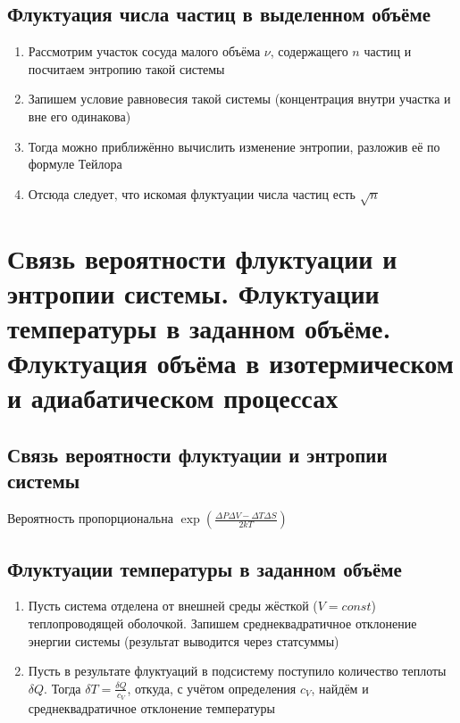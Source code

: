 \documentclass[a4paper, 14pt]{article}
\begin{document}
    \subsection{Флуктуация числа частиц в выделенном объёме}

    \begin{enumerate}
        \item Рассмотрим участок сосуда малого объёма $\nu$, содержащего $n$ частиц и посчитаем энтропию такой системы
        \item Запишем условие равновесия такой системы (концентрация внутри участка и вне его одинакова)
        \item Тогда можно приближённо вычислить изменение энтропии, разложив её по формуле Тейлора
        \item Отсюда следует, что искомая флуктуации числа частиц есть $\sqrt{n}$
    \end{enumerate}

    \section{Связь вероятности флуктуации и энтропии системы.
    Флуктуации температуры в заданном объёме.
    Флуктуация объёма в изотермическом и адиабатическом процессах}

    \subsection{Связь вероятности флуктуации и энтропии системы}

    Вероятность пропорциональна $\exp \left(\frac{\Delta P \Delta V - \Delta T \Delta S}{2kT}\right)$

    \subsection{Флуктуации температуры в заданном объёме}

    \begin{enumerate}
        \item Пусть система отделена от внешней среды жёсткой ($V = const$) теплопроводящей оболочкой.
        Запишем среднеквадратичное отклонение энергии системы (результат выводится через статсуммы)
        \item Пусть в результате флуктуаций в подсистему поступило количество теплоты $\delta Q$.
        Тогда $\delta T = \frac{\delta Q}{c_V}$, откуда, с учётом определения $c_V$, найдём и среднеквадратичное
        отклонение температуры
    \end{enumerate}
\end{document}
